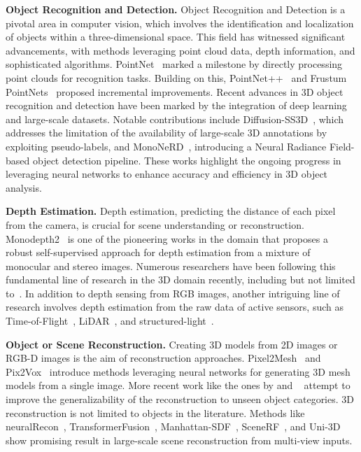 \vspace{1ex}
\noindent\textbf{Object Recognition and Detection.} Object Recognition and Detection is a pivotal area in computer vision, which involves the identification and localization of objects within a three-dimensional space. This field has witnessed significant advancements, with methods leveraging point cloud data, depth information, and sophisticated algorithms. PointNet~\citep{qi2017pointnet} marked a milestone by directly processing point clouds for recognition tasks. Building on this, PointNet++~\citep{qi2017pointnet++} and Frustum PointNets~\citep{qi2018frustum} proposed incremental improvements. Recent advances in 3D object recognition and detection have been marked by the integration of deep learning and large-scale datasets. Notable contributions include Diffusion-SS3D~\citep{ho2023diffusion}, which addresses the limitation of the availability of large-scale 3D annotations by exploiting pseudo-labels, and MonoNeRD~\citep{xu2023mononerd}, introducing a Neural Radiance Field-based object detection pipeline. These works highlight the ongoing progress in leveraging neural networks to enhance accuracy and efficiency in 3D object analysis.

\vspace{1ex}
\noindent\textbf{Depth Estimation.} Depth estimation, predicting the distance of each pixel from the camera, is crucial for scene understanding or reconstruction. Monodepth2~\citep{godard2019digging} is one of the pioneering works in the domain that proposes a robust self-supervised approach for depth estimation from a mixture of monocular and stereo images. Numerous researchers have been following this fundamental line of research in the 3D domain recently, including but not limited to~\cite{zhao2023gasmono, shao2023nddepth, yang2023gedepth, zhou2023two, piccinelli2023idisc}. In addition to depth sensing from RGB images, another intriguing line of research involves depth estimation from the raw data of active sensors, such as Time-of-Flight~\citep{li2022deltar}, LiDAR~\citep{bartoccioni2023lidartouch}, and structured-light~\citep{riegler2019connecting}.

\vspace{1ex}
\noindent\textbf{Object or Scene Reconstruction.} Creating 3D models from 2D images or RGB-D images is the aim of reconstruction approaches. Pixel2Mesh~\citep{wang2018pixel2mesh} and Pix2Vox~\citep{xie2019pix2vox} introduce methods leveraging neural networks for generating 3D mesh models from a single image. More recent work like the ones by \cite{yang2023single} and ~\cite{zhang2022monocular} attempt to improve the generalizability of the reconstruction to unseen object categories. 3D reconstruction is not limited to objects in the literature. Methods like neuralRecon~\citep{sun2021neuralrecon}, TransformerFusion~\citep{bozic2021transformerfusion}, Manhattan-SDF~\citep{guo2022neural}, SceneRF~\citep{cao2023scenerf}, and Uni-3D~\citep{zhang2023uni} show promising result in large-scale scene reconstruction from multi-view inputs.


